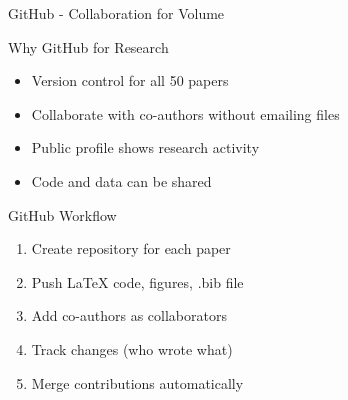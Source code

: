 \documentclass[11pt]{beamer}
\begin{document}
	\begin{frame}{GitHub - Collaboration for Volume}
		\scriptsize
		\begin{block}{Why GitHub for Research}
			\begin{itemize}
				\item Version control for all 50 papers
				\item Collaborate with co-authors without emailing files
				\item Public profile shows research activity
				\item Code and data can be shared
			\end{itemize}
		\end{block}
		\begin{block}{GitHub Workflow}
			\begin{enumerate}
				\item Create repository for each paper
				\item Push LaTeX code, figures, .bib file
				\item Add co-authors as collaborators
				\item Track changes (who wrote what)
				\item Merge contributions automatically
			\end{enumerate}
		\end{block}
	\end{frame}
	
\end{document}
